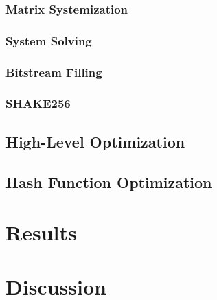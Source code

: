 \documentclass[11pt,a4paper]{report}
\theoremstyle{definition}
\begin{document}
\subsection{Matrix Systemization}
\label{sec:matrixsystemization}

\subsection{System Solving}
\label{sec:systemsolving}

\subsection{Bitstream Filling}
\label{sec:bitstreamfilling}

\subsection{SHAKE256}
\label{sec:shake256lowlevel}

\section{High-Level Optimization}
\label{sec:highleveloptimization}

\section{Hash Function Optimization}
\label{sec:hashfunctionoptimization}

\chapter{Results}
\label{ch:results}

\chapter{Discussion}
\label{ch:discussion}
\end{document}
